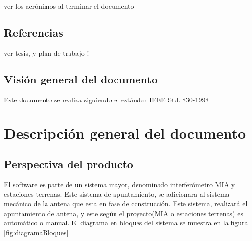 \documentclass[12pt,a4paper, twosite]{article}
\begin{document}
	ver los acrónimos al terminar el documento 
	
	
	\subsection{Referencias}
	\label{sec:org62711e0}
	ver tesis, y plan de trabajo ! 
	
	\subsection{Visión general del documento}
	\label{sec:orgdaca22c}
	
	Este documento se realiza siguiendo el estándar IEEE Std. 830-1998
	
	
	\section{Descripción general del documento}
	\label{sec:orgc1c4017}
	
	\subsection{Perspectiva del producto}
	\label{sec:org24980a8}
	El software es parte de un sistema mayor, denominado interferómetro MIA y estaciones terrenas. Este sistema de apuntamiento, se adicionara al sistema mecánico de la antena que esta en fase de construcción. Este sistema, realizará el apuntamiento de antena, y este según el proyecto(MIA o estaciones terrenas) es automático o manual. El diagrama en bloques del sistema se muestra en la figura \ref{fig:diagramaBloques}. 
	
\end{document}
